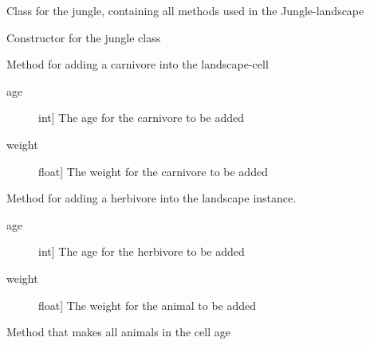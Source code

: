 \documentclass[a4paper,10pt,english]{sphinxmanual}
\begin{document}
\begin{fulllineitems}
\label{\detokenize{landscape:biosim.landscape.Jungle}}
Class for the jungle, containing all methods used in the Jungle-landscape

Constructor for the jungle class

\begin{fulllineitems}
\label{\detokenize{landscape:biosim.landscape.Jungle.add_carnivore}}
Method for adding a carnivore into the landscape-cell
\begin{description}
\item[{age}] \leavevmode{[}int{]}
The age for the carnivore to be added

\item[{weight}] \leavevmode{[}float{]}
The weight for the carnivore to be added

\end{description}

\end{fulllineitems}


\begin{fulllineitems}
\label{\detokenize{landscape:biosim.landscape.Jungle.add_herbivore}}
Method for adding a herbivore into the landscape instance.
\begin{description}
\item[{age}] \leavevmode{[}int{]}
The age for the herbivore to be added

\item[{weight}] \leavevmode{[}float{]}
The weight for the animal to be added

\end{description}

\end{fulllineitems}


\begin{fulllineitems}
\label{\detokenize{landscape:biosim.landscape.Jungle.aging}}
Method that makes all animals in the cell age


\end{fulllineitems}
\end{fulllineitems}
\end{document}
